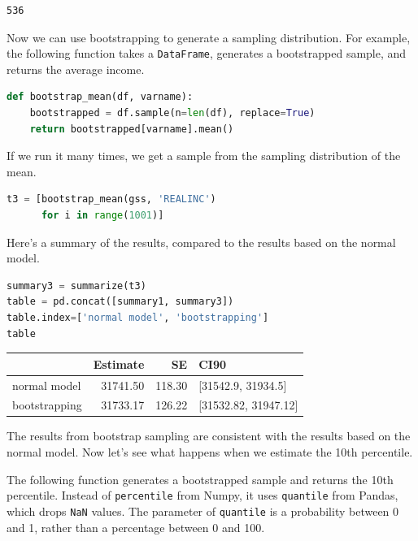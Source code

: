 \begin{lstlisting}[style=output]
536
\end{lstlisting}

Now we can use bootstrapping to generate a sampling distribution. For
example, the following function takes a
\passthrough{\lstinline!DataFrame!}, generates a bootstrapped sample,
and returns the average income.

\begin{lstlisting}[language=Python,style=source]
def bootstrap_mean(df, varname):
    bootstrapped = df.sample(n=len(df), replace=True)
    return bootstrapped[varname].mean()
\end{lstlisting}

If we run it many times, we get a sample from the sampling distribution
of the mean.

\begin{lstlisting}[language=Python,style=source]
t3 = [bootstrap_mean(gss, 'REALINC')
      for i in range(1001)]
\end{lstlisting}

Here's a summary of the results, compared to the results based on the
normal model.

\begin{lstlisting}[language=Python,style=source]
summary3 = summarize(t3)
table = pd.concat([summary1, summary3])
table.index=['normal model', 'bootstrapping']
table
\end{lstlisting}

\begin{tabular}{lrrl}
\toprule
{} &  Estimate &      SE &                  CI90 \\
\midrule
normal model  &  31741.50 &  118.30 &    [31542.9, 31934.5] \\
bootstrapping &  31733.17 &  126.22 &  [31532.82, 31947.12] \\
\bottomrule
\end{tabular}

The results from bootstrap sampling are consistent with the results
based on the normal model. Now let's see what happens when we estimate
the 10th percentile.

The following function generates a bootstrapped sample and returns the
10th percentile. Instead of \passthrough{\lstinline!percentile!} from
Numpy, it uses \passthrough{\lstinline!quantile!} from Pandas, which
drops \passthrough{\lstinline!NaN!} values. The parameter of
\passthrough{\lstinline!quantile!} is a probability between 0 and 1,
rather than a percentage between 0 and 100.

